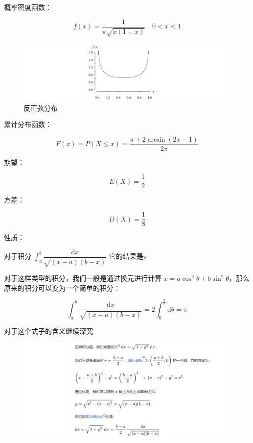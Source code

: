 \documentclass[12pt, a4paper, oneside]{ctexbook}
\begin{document}
 概率密度函数：

$$
f(x) = \dfrac{1}{\pi \sqrt{x(1 - x)}} \quad 0 < x < 1
$$

\begin{figure}[H]
  \centering
  \includegraphics[width=1\textwidth]{image/反正弦分布.png}
  \caption{反正弦分布}
  \label{fig:example}
\end{figure}

 累计分布函数：

$$
F(x) = P(X \leq x) = \dfrac{\pi + 2\arcsin(2x - 1)}{2\pi}
$$

 期望：

$$
E(X) = \dfrac{1}{2}
$$

 方差：

$$
D(X) = \dfrac{1}{8}
$$

 性质：

对于积分 $\int_{a}^{b}\dfrac{\mathrm{d}x}{\sqrt{(x - a)(b - x)}}$ 它的结果是$\pi$

对于这样类型的积分，我们一般是通过换元进行计算 $x  =a\cos^{2}\theta + b\sin^{2}\theta$，那么原来的积分可以变为一个简单的积分：

$$
\int_a^{b}\dfrac{\mathrm{d}x}{\sqrt{(x - a)(b - x)}} = 2\int_0^{\frac{\pi}{2}} \mathrm{d}\theta = \pi
$$

对于这个式子的含义继续深究

\begin{figure}[H]
  \centering
  \includegraphics[width=1\textwidth]{image/反正弦分布1.png}
  \label{fig:example}
\end{figure}
\end{document}
